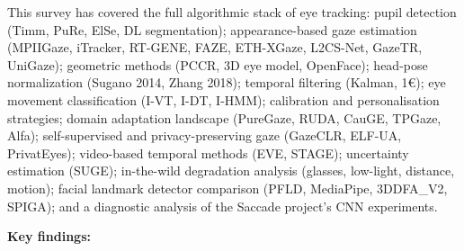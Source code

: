 \documentclass[11pt,a4paper]{article}
\begin{document}
This survey has covered the full algorithmic stack of eye tracking:
pupil detection (Timm, PuRe, ElSe, DL segmentation);
appearance-based gaze estimation (MPIIGaze, iTracker, RT-GENE, FAZE, ETH-XGaze, L2CS-Net, GazeTR, UniGaze);
geometric methods (PCCR, 3D eye model, OpenFace);
head-pose normalization (Sugano 2014, Zhang 2018);
temporal filtering (Kalman, 1\euro);
eye movement classification (I-VT, I-DT, I-HMM);
calibration and personalisation strategies;
domain adaptation landscape (PureGaze, RUDA, CauGE, TPGaze, Alfa);
self-supervised and privacy-preserving gaze (GazeCLR, ELF-UA, PrivatEyes);
video-based temporal methods (EVE, STAGE);
uncertainty estimation (SUGE);
in-the-wild degradation analysis (glasses, low-light, distance, motion);
facial landmark detector comparison (PFLD, MediaPipe, 3DDFA\_V2, SPIGA);
and a diagnostic analysis of the Saccade project's CNN experiments.

\textbf{Key findings:}
\end{document}
